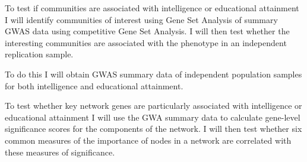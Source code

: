 To test if communities are associated with intelligence or educational attainment I will identify communities of interest using Gene Set Analysis of summary GWAS data using competitive Gene Set Analysis. I will then test whether the interesting communities are associated with the phenotype in an independent replication sample.

To do this I will obtain GWAS summary data of independent population samples for both intelligence and educational attainment. 

To test whether key network genes are particularly associated with intelligence or educational attainment I will use the GWA summary data to calculate gene-level significance scores for the components of the network. I will then test whether six common measures of the importance of nodes in a network are correlated with these measures of significance.













